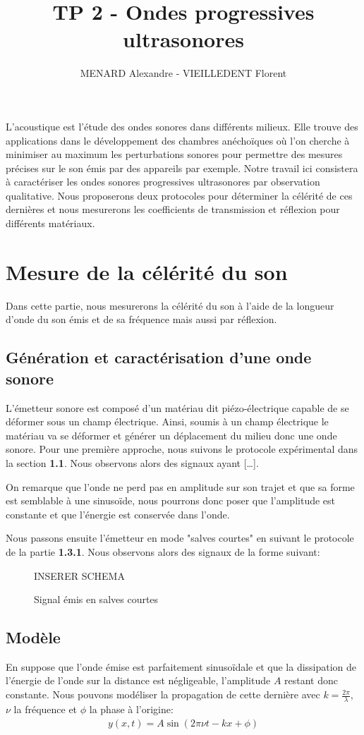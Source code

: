 \documentclass[12pt]{article}
\title{\vspace{-2cm}\textbf{TP 2 - Ondes progressives ultrasonores}}
\author{MENARD Alexandre - VIEILLEDENT Florent}
\date{\vspace{-0.5cm}}
\begin{document}
\maketitle

L'acoustique est l'étude des ondes sonores dans différents milieux. Elle trouve des applications dans le développement des chambres
anéchoïques où l'on cherche à minimiser au maximum les perturbations sonores pour permettre des mesures précises sur le son émis par des appareils par exemple. 
Notre travail ici consistera à caractériser les ondes sonores progressives ultrasonores par observation qualitative. Nous proposerons
deux protocoles pour déterminer la célérité de ces dernières et nous mesurerons les coefficients de transmission et réflexion pour différents matériaux.

\section{Mesure de la célérité du son}
Dans cette partie, nous mesurerons la célérité du son à l'aide de la longueur d'onde du son émis et de sa fréquence mais aussi par réflexion. 

\subsection{Génération et caractérisation d'une onde sonore}
L'émetteur sonore est composé d'un matériau dit piézo-électrique capable de se déformer sous un champ électrique. Ainsi, soumis à un champ électrique
le matériau va se déformer et générer un déplacement du milieu donc une onde sonore. Pour une première approche, nous suivons le protocole
expérimental dans la section \textbf{1.1}. Nous observons alors des signaux ayant [\dots].

On remarque que l'onde ne perd pas en amplitude sur son trajet et que sa forme est semblable à une sinusoïde, nous pourrons donc poser que l'amplitude est constante et que l'énergie est conservée dans l'onde.

Nous passons ensuite l'émetteur en mode "salves courtes" en suivant le protocole de la partie \textbf{1.3.1}. Nous observons alors des signaux de la forme suivant:
\begin{figure}[!htbp]
	\centering
	INSERER SCHEMA
	\hfill
	\caption{Signal émis en salves courtes}
\end{figure}

\subsection{Modèle}
En suppose que l'onde émise est parfaitement sinusoïdale et que la dissipation de l'énergie de l'onde sur la distance est négligeable, l'amplitude $A$ restant donc constante. 
Nous pouvons modéliser la propagation de cette dernière avec $k=\frac{2\pi}{\lambda}$, $\nu$ la fréquence et $\phi$ la phase à l'origine:
\begin{align}
	y(x, t) = A \sin(2\pi\nu t - kx + \phi)
\end{align}
\end{document}
